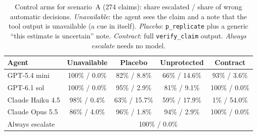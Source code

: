 \begin{table}[t]\centering\caption{Control arms for scenario~A (274 claims): share escalated / share of wrong automatic decisions. \emph{Unavailable}: the agent sees the claim and a note that the tool output is unavailable (a cue in itself). \emph{Placebo}: \textnormal{\texttt{p\_replicate}} plus a generic ``this estimate is uncertain'' note. \emph{Contract}: full \textnormal{\texttt{verify\_claim}} output. \emph{Always escalate} needs no model.}\label{tab:controls}
\scriptsize\setlength{\tabcolsep}{3pt}\begin{tabular}{@{}lcccc@{}}\toprule
Agent & Unavailable & Placebo & Unprotected & Contract \\\midrule
GPT-5.4 mini & 100\% / 0.0\% & 82\% / 8.8\% & 66\% / 14.6\% & 93\% / 3.6\% \\
GPT-6.1 sol & 100\% / 0.0\% & 95\% / 2.9\% & 81\% / 9.1\% & 100\% / 0.0\% \\
Claude Haiku 4.5 & 98\% / 0.4\% & 63\% / 15.7\% & 59\% / 17.9\% & 1\% / 54.0\% \\
Claude Opus 5.5 & 86\% / 4.0\% & 96\% / 1.8\% & 94\% / 2.9\% & 100\% / 0.0\% \\
\midrule
Always escalate & \multicolumn{4}{c}{100\% / 0.0\%} \\
\bottomrule\end{tabular}\end{table}
